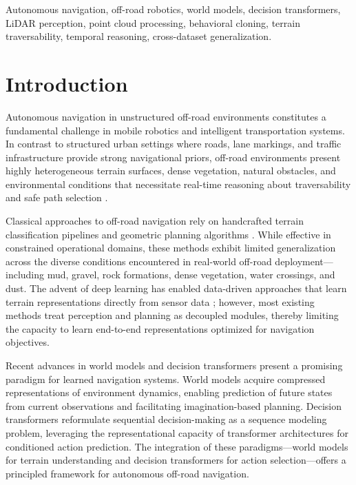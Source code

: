 \documentclass[journal]{IEEEtran}
\begin{document}
\begin{IEEEkeywords}
Autonomous navigation, off-road robotics, world models, decision transformers, LiDAR perception, point cloud processing, behavioral cloning, terrain traversability, temporal reasoning, cross-dataset generalization.
\end{IEEEkeywords}

\section{Introduction}
\label{sec:introduction}

Autonomous navigation in unstructured off-road environments constitutes a fundamental challenge in mobile robotics and intelligent transportation systems. In contrast to structured urban settings where roads, lane markings, and traffic infrastructure provide strong navigational priors, off-road environments present highly heterogeneous terrain surfaces, dense vegetation, natural obstacles, and environmental conditions that necessitate real-time reasoning about traversability and safe path selection \cite{wellhausen2019, xiao2021}.

Classical approaches to off-road navigation rely on handcrafted terrain classification pipelines and geometric planning algorithms \cite{papadakis2013}. While effective in constrained operational domains, these methods exhibit limited generalization across the diverse conditions encountered in real-world off-road deployment---including mud, gravel, rock formations, dense vegetation, water crossings, and dust. The advent of deep learning has enabled data-driven approaches that learn terrain representations directly from sensor data \cite{maturana2018, wigness2019}; however, most existing methods treat perception and planning as decoupled modules, thereby limiting the capacity to learn end-to-end representations optimized for navigation objectives.

Recent advances in world models \cite{ha2018, hafner2020, hafner2023} and decision transformers \cite{chen2021, zheng2022} present a promising paradigm for learned navigation systems. World models acquire compressed representations of environment dynamics, enabling prediction of future states from current observations and facilitating imagination-based planning. Decision transformers reformulate sequential decision-making as a sequence modeling problem, leveraging the representational capacity of transformer architectures \cite{vaswani2017} for conditioned action prediction. The integration of these paradigms---world models for terrain understanding and decision transformers for action selection---offers a principled framework for autonomous off-road navigation.
\end{document}
